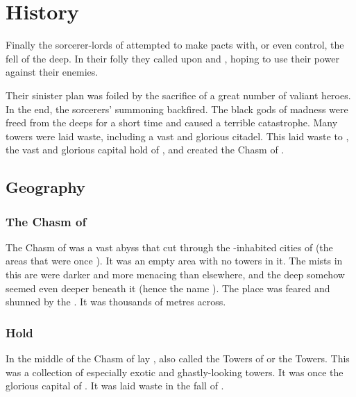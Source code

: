 \section{History}
Finally the sorcerer-lords of \Tarcharos attempted to make pacts with, or even control, the fell  of the deep. 
In their folly they called upon \Norganthus and \Tzyaragoth, hoping to use their power against their enemies. 

Their sinister plan was foiled by the sacrifice of a great number of valiant heroes.
In the end, the sorcerers' summoning backfired.
The black gods of madness were freed from the deeps for a short time and caused a terrible catastrophe.
Many towers were laid waste, including a vast and glorious citadel. 
This laid waste to \Hyardes, the vast and glorious capital hold of \Tarcharos, and created the Chasm of .









\subsection{Geography}





\subsubsection{The Chasm of \Oggra}
\index{\Oggra}
The Chasm of \Oggra was a vast abyss that cut through the \resphan-inhabited cities of \Nyx (the areas that were once \Merkyrah). 
It was an empty area with no towers in it.
The mists in this are were darker and more menacing than elsewhere, and the deep somehow seemed even deeper beneath it (hence the name ). 
The place was feared and shunned by the \resphain. 
It was thousands of metres across. 





\subsubsection{\Hyardes Hold}
\index{\Carcosa}
\index{\Hyardes}
In the middle of the Chasm of \Oggra lay \Carcosa, also called the Towers of \Hyardes or the \Hyardes Towers. 
This was a collection of especially exotic and ghastly-looking towers. 
It was once the glorious capital of \Tarcharos.
It was laid waste in the fall of \Tarcharos.

